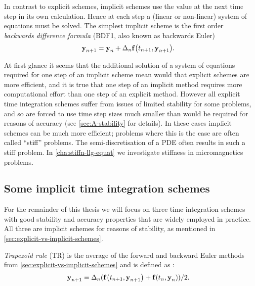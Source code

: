 In contrast to explicit schemes, implicit schemes use the value at the next time step in its own calculation.
Hence at each step a (linear or non-linear) system of equations must be solved.
The simplest implicit scheme is the first order \emph{backwards difference formula} (BDF1, also known as backwards Euler)
\begin{equation}
  \label{eq:bdf1-definition}
  \boldsymbol{\mathrm{y}}_{n+1} = \boldsymbol{\mathrm{y}}_n + \Delta_{n} {\boldsymbol{\mathrm{f}}{\left( t_{n+1}, \boldsymbol{\mathrm{y}}_{n+1} \right)}}.
\end{equation}

At first glance it seems that the additional solution of a system of equations required for one step of an implicit scheme mean would that explicit schemes are more efficient, and it is true that one step of an implicit method requires more computational effort than one step of an explicit method.
However all explicit time integration schemes suffer from issues of limited stability for some problems, and so are forced to use time step sizes much smaller than would be required for reasons of accuracy (see \cref{sec:A-stability} for details).
In these cases implicit schemes can be much more efficient; problems where this is the case are often called ``stiff'' problems.
The semi-discretisation of a PDE often results in such a stiff problem.
In \cref{cha:stiffn-llg-equat} we investigate stiffness in micromagnetics problems.




\subsection{Some implicit time integration schemes}
\label{sec:some-implicit-time-integrators}

For the remainder of this thesis we will focus on three time integration schemes with good stability and accuracy properties that are widely employed in practice.
All three are implicit schemes for reasons of stability, as mentioned in \cref{sec:explicit-vs-implicit-schemes}.

\emph{Trapezoid rule} (TR) is the average of the forward and backward Euler methods from \cref{sec:explicit-vs-implicit-schemes} and is defined as \cite[260]{GreshoSani}:
\begin{equation}
  \boldsymbol{\mathrm{y}}_{n+1} = \Delta_{n} ({\boldsymbol{\mathrm{f}}{\left( t_{n+1}, \boldsymbol{\mathrm{y}}_{n+1} \right)}} + {\boldsymbol{\mathrm{f}}{\left( t_n, \boldsymbol{\mathrm{y}}_n \right)}})/2.
  \label{eq:tr-definition}
\end{equation}

